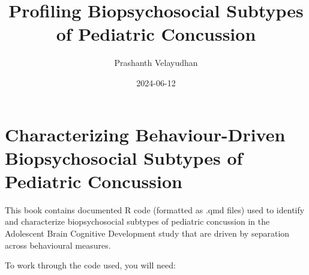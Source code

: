 \documentclass[
  letterpaper,
  DIV=11,
  numbers=noendperiod]{scrreprt}
\title{Profiling Biopsychosocial Subtypes of Pediatric Concussion}
\author{Prashanth Velayudhan}
\date{2024-06-12}
\renewcommand*\contentsname{Table of contents}
\newcommand\contentsname{Table of contents}
\begin{document}
\maketitle

\renewcommand*\contentsname{Table of contents}
{
\hypersetup{linkcolor=}
\setcounter{tocdepth}{2}
\tableofcontents
}
\chapter{Characterizing Behaviour-Driven Biopsychosocial Subtypes of
Pediatric
Concussion}\label{characterizing-behaviour-driven-biopsychosocial-subtypes-of-pediatric-concussion}

This book contains documented R code (formatted as .qmd files) used to
identify and characterize biopsychosocial subtypes of pediatric
concussion in the Adolescent Brain Cognitive Development study that are
driven by separation across behavioural measures.

To work through the code used, you will need:
\end{document}
